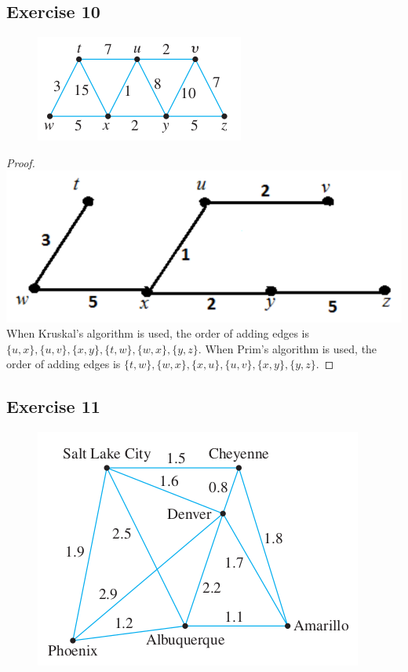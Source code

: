\documentclass[14pt]{extarticle}
\begin{document}
\subsection{Exercise 10}
\begin{figure}[ht!]
    \centering
    \includegraphics[scale=0.5]{../images/10.6.10.png}
\end{figure}

\begin{proof}
    \includegraphics[scale=0.3]{../images/10.6.10.2.png}
    When Kruskal's algorithm is used, the order of adding edges is
    \(\{u, x\}, \{u, v\}, \{x, y\}, \{t, w\}, \{w, x\}, \{y, z\}\). When Prim's algorithm is used, the order of adding edges
    is \(\{t, w\}, \{w, x\}, \{x, u\}, \{u, v\}, \{x, y\}, \{y, z\}\).
\end{proof}

\subsection{Exercise 11}
\begin{figure}[ht!]
    \centering
    \includegraphics[scale=0.5]{../images/10.6.11.png}
\end{figure}
\end{document}
